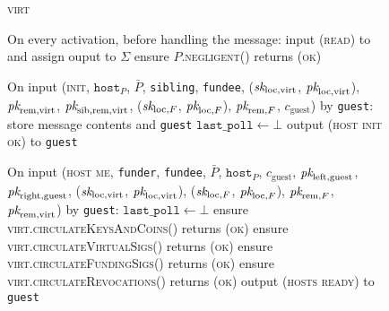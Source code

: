 \begin{figure}[H]
  \begin{processbox}{\textsc{virt}}
    \begin{algorithmic}[1]
      \State On every activation, before handling the message:
      \Indent
         
          \State input (\textsc{read}) to \ledger and assign ouput to $\Sigma$
              \State ensure $P$.\textsc{negligent}() returns (\textsc{ok})
            \EndFor
          \EndIf
        \EndIf
      \EndIndent
      \Statex

      \State {}
      \State On input (\textsc{init}, $\texttt{host}_P$, $\bar{P}$,
      \texttt{sibling}, \texttt{fundee}, ($\textit{sk}_{\mathrm{loc}, \mathrm{virt}}$,
      $\textit{pk}_{\mathrm{loc}, \mathrm{virt}}$), $\textit{pk}_{\mathrm{rem}, \mathrm{virt}}$,
      $\textit{pk}_{\mathrm{sib}, \mathrm{rem}, \mathrm{virt}}$, ($\textit{sk}_{\mathrm{loc}, F}$,
      $\textit{pk}_{\mathrm{loc}, F}$), $\textit{pk}_{\mathrm{rem}, F}$, $c_{\mathrm{guest}}$) by
      \texttt{guest}:
      \Indent
        \State store message contents and \texttt{guest}
        \State $\texttt{last\_poll} \gets \bot$
        \State output (\textsc{host init ok}) to \texttt{guest}
      \EndIndent
      \Statex

      \State On input (\textsc{host me}, \texttt{funder}, \texttt{fundee},
      $\bar{P}$, $\texttt{host}_P$, $c_{\mathrm{guest}}$, $\textit{pk}_{\mathrm{left},
      \mathrm{guest}}$, $\textit{pk}_{\mathrm{right}, \mathrm{guest}}$,
      ($\textit{sk}_{\mathrm{loc}, \mathrm{virt}}$, $\textit{pk}_{\mathrm{loc}, \mathrm{virt}}$),
      ($\textit{sk}_{\mathrm{loc}, F}$, $\textit{pk}_{\mathrm{loc}, F}$), $\textit{pk}_{\mathrm{rem}, F}$,
      $\textit{pk}_{\mathrm{rem}, \mathrm{virt}}$) by \texttt{guest}:
      \Indent
        \State $\texttt{last\_poll} \gets \bot$
        \State ensure \textsc{virt.circulateKeysAndCoins}() returns (\textsc{ok})
        \State ensure \textsc{virt.circulateVirtualSigs}() returns (\textsc{ok})
        \State ensure \textsc{virt.circulateFundingSigs}() returns (\textsc{ok})
        \State ensure \textsc{virt.circulateRevocations}() returns (\textsc{ok})
        \State output (\textsc{hosts ready}) to \texttt{guest}
      \EndIndent
    \end{algorithmic}
  \end{processbox}
  \caption{}
  \label{code:virtual-layer:keys}
\end{figure}

